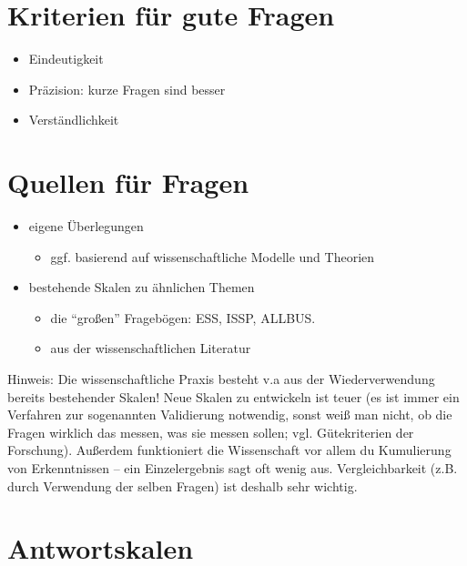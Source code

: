 \documentclass[
]{book}
\providecommand{\tightlist}{%
  \setlength{\itemsep}{0pt}\setlength{\parskip}{0pt}}
\begin{document}
\hypertarget{kriterien-fuxfcr-gute-fragen}{%
\section{Kriterien für gute Fragen}\label{kriterien-fuxfcr-gute-fragen}}

\begin{itemize}
\tightlist
\item
  Eindeutigkeit
\item
  Präzision: kurze Fragen sind besser
\item
  Verständlichkeit
\end{itemize}

\hypertarget{quellen-fuxfcr-fragen}{%
\section{Quellen für Fragen}\label{quellen-fuxfcr-fragen}}

\begin{itemize}
\tightlist
\item
  eigene Überlegungen

  \begin{itemize}
  \tightlist
  \item
    ggf. basierend auf wissenschaftliche Modelle und Theorien
  \end{itemize}
\item
  bestehende Skalen zu ähnlichen Themen

  \begin{itemize}
  \tightlist
  \item
    die ``großen'' Fragebögen: ESS, ISSP, ALLBUS.
  \item
    aus der wissenschaftlichen Literatur
  \end{itemize}
\end{itemize}

Hinweis: Die wissenschaftliche Praxis besteht v.a aus der Wiederverwendung bereits bestehender Skalen! Neue Skalen zu entwickeln ist teuer (es ist immer ein Verfahren zur sogenannten Validierung notwendig, sonst weiß man nicht, ob die Fragen wirklich das messen, was sie messen sollen; vgl. Gütekriterien der Forschung). Außerdem funktioniert die Wissenschaft vor allem du Kumulierung von Erkenntnissen -- ein Einzelergebnis sagt oft wenig aus. Vergleichbarkeit (z.B. durch Verwendung der selben Fragen) ist deshalb sehr wichtig.

\hypertarget{antwortskalen}{%
\section{Antwortskalen}\label{antwortskalen}}
\end{document}
